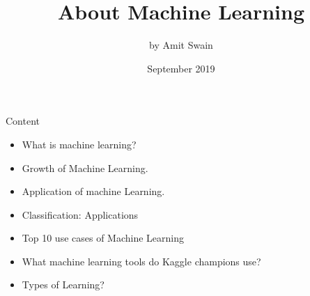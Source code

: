\documentclass{beamer}
\title{About Machine Learning}
\author{by Amit Swain}
\date{September 2019}
\begin{document}
\maketitle
\begin{frame}{Content}
\begin{itemize}
\item What is machine learning? 
\item Growth of Machine Learning.
\item Application of machine Learning. 
\item Classification:  Applications
 \item Top 10 use cases of Machine Learning
 \item What machine learning tools do Kaggle champions use?
    \item Types of Learning? 
\end{itemize}
\end{frame}
\end{document}
